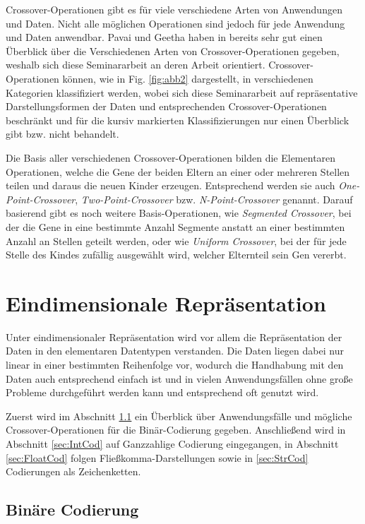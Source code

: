 \documentclass{llncs}
\begin{document}
	Crossover-Operationen gibt es für viele verschiedene Arten von Anwendungen und Daten. Nicht alle möglichen Operationen sind jedoch für jede Anwendung und Daten anwendbar. Pavai und Geetha haben in \cite{Survey} bereits sehr gut einen Überblick über die Verschiedenen Arten von Crossover-Operationen gegeben, weshalb sich diese Seminararbeit an deren Arbeit orientiert. Crossover-Operationen können, wie in Fig. \ref{fig:abb2} dargestellt, in verschiedenen Kategorien klassifiziert werden, wobei sich diese Seminararbeit auf repräsentative Darstellungsformen der Daten und entsprechenden Crossover-Operationen beschränkt und für die kursiv markierten Klassifizierungen nur einen Überblick gibt bzw. nicht behandelt.

	Die Basis aller verschiedenen Crossover-Operationen bilden die Elementaren Operationen, welche die Gene der beiden Eltern an einer oder mehreren Stellen teilen und daraus die neuen Kinder erzeugen. Entsprechend werden sie auch \textit{One-Point-Crossover}, \textit{Two-Point-Crossover} bzw. \textit{N-Point-Crossover} genannt. Darauf basierend gibt es noch weitere Basis-Operationen, wie \textit{Segmented Crossover}, bei der die Gene in eine bestimmte Anzahl Segmente anstatt an einer bestimmten Anzahl an Stellen geteilt werden\cite{GABasicIdeas}, oder wie \textit{Uniform Crossover}, bei der für jede Stelle des Kindes zufällig ausgewählt wird, welcher Elternteil sein Gen vererbt. %

\section{Eindimensionale Repräsentation}
\label{sec:EindimensionaleRep}

	Unter eindimensionaler Repräsentation wird vor allem die Repräsentation der Daten in den elementaren Datentypen verstanden. Die Daten liegen dabei nur linear in einer bestimmten Reihenfolge vor, wodurch die Handhabung mit den Daten auch entsprechend einfach ist und in vielen Anwendungsfällen ohne große Probleme durchgeführt werden kann und entsprechend oft genutzt wird.
	
	Zuerst wird im Abschnitt \ref{sec:BinCod} ein Überblick über Anwendungsfälle und mögliche Crossover-Operationen für die Binär-Codierung gegeben. Anschließend wird in Abschnitt \ref{sec:IntCod} auf Ganzzahlige Codierung eingegangen, in Abschnitt \ref{sec:FloatCod} folgen Fließkomma-Darstellungen sowie in \ref{sec:StrCod} Codierungen als Zeichenketten.

	\subsection{Binäre Codierung}
	\label{sec:BinCod}
	
\end{document}
